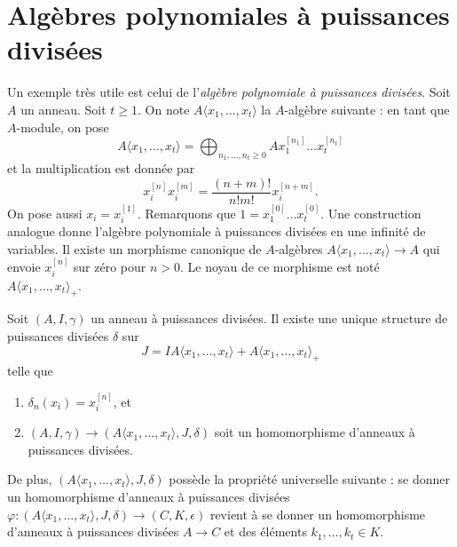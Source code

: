 \section{Algèbres polynomiales à puissances divisées}
\label{section-divided-power-polynomial-ring}

\noindent
Un exemple très utile est celui de l'{\it algèbre polynomiale à puissances divisées}.
Soit $A$ un anneau. Soit $t \geq 1$. On note
$A\langle x_1, \ldots, x_t \rangle$ la $A$-algèbre suivante :
en tant que $A$-module, on pose
$$
A\langle x_1, \ldots, x_t \rangle =
\bigoplus\nolimits_{n_1, \ldots, n_t \geq 0} A x_1^{[n_1]} \ldots x_t^{[n_t]}
$$
et la multiplication est donnée par
$$
x_i^{[n]}x_i^{[m]} = \frac{(n + m)!}{n!m!}x_i^{[n + m]}.
$$
On pose aussi $x_i = x_i^{[1]}$. Remarquons que
$1 = x_1^{[0]} \ldots x_t^{[0]}$. Une construction analogue donne
l'algèbre polynomiale à puissances divisées en une infinité de variables.
Il existe un morphisme canonique de $A$-algèbres
$A\langle x_1, \ldots, x_t \rangle\to A$ qui envoie $x_i^{[n]}$ sur zéro
pour $n > 0$. Le noyau de ce morphisme est noté
$A\langle x_1, \ldots, x_t \rangle_{+}$.

\begin{lemma}
\label{lemma-divided-power-polynomial-algebra}
Soit $(A, I, \gamma)$ un anneau à puissances
divisées. Il existe une unique structure de puissances divisées $\delta$ sur
$$
J = IA\langle x_1, \ldots, x_t \rangle + A\langle x_1, \ldots, x_t \rangle_{+}
$$
telle que
\begin{enumerate}
\item $\delta_n(x_i) = x_i^{[n]}$, et
\item $(A, I, \gamma) \to (A\langle x_1, \ldots, x_t \rangle, J, \delta)$
soit un homomorphisme d'anneaux à puissances divisées.
\end{enumerate}
De plus, $(A\langle x_1, \ldots, x_t \rangle, J, \delta)$ possède
la propriété universelle suivante : se donner un homomorphisme d'anneaux à puissances divisées
$\varphi : (A\langle x_1, \ldots, x_t \rangle, J, \delta) \to
(C, K, \epsilon)$ revient
à se donner un homomorphisme d'anneaux à puissances divisées
$A \to C$ et des éléments $k_1, \ldots, k_t \in K$.
\end{lemma}

